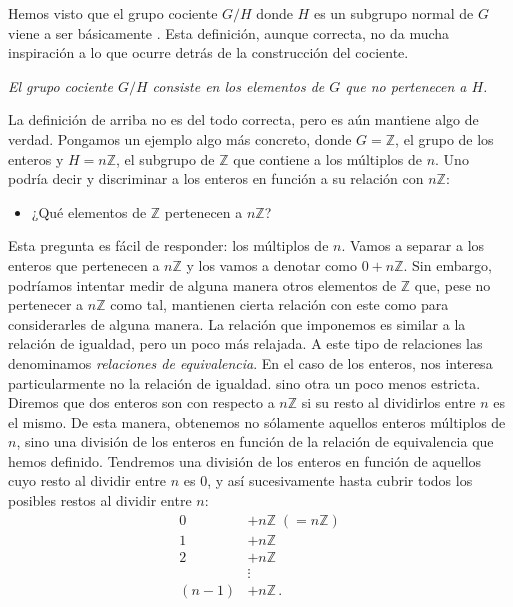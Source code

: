 \documentclass[a4paper,11pt]{amsart}
\theoremstyle{plain}
\theoremstyle{definition}
\theoremstyle{remark}
\begin{document}
Hemos visto que el grupo cociente $G/H$ donde $H$ es un subgrupo normal de $G$ viene a ser básicamente . Esta definición, aunque correcta, no da mucha inspiración a lo que ocurre detrás de la construcción del cociente. 

\begin{center}
    \textit{El grupo cociente $G/H$ consiste en los elementos de $G$ que no pertenecen a $H$.}
\end{center}
La definición de arriba no es del todo correcta, pero es aún mantiene algo de verdad. Pongamos un ejemplo algo más concreto, donde $G = \mathbb{Z}$, el grupo de los enteros y $H = n \mathbb{Z}$, el subgrupo de $\mathbb{Z}$ que contiene a los múltiplos de $n$. Uno podría decir y discriminar a los enteros en función a su relación con $n \mathbb{Z}$: 
\begin{itemize}
    \item ¿Qué elementos de $\mathbb{Z}$ pertenecen a $n \mathbb{Z}$?
\end{itemize}
Esta pregunta es fácil de responder: los múltiplos de $n$. Vamos a separar a los enteros que pertenecen a $n \mathbb{Z}$ y los vamos a denotar como $0 + n \mathbb{Z}$. Sin embargo, podríamos intentar medir de alguna manera otros elementos de $\mathbb{Z}$ que, pese no pertenecer a $n \mathbb{Z}$ como tal, mantienen cierta relación con este como para considerarles  de alguna manera. La relación que imponemos es similar a la relación de igualdad, pero un poco más relajada. A este tipo de relaciones las denominamos \textit{relaciones de equivalencia}. En el caso de los enteros, nos interesa particularmente no la relación de igualdad. sino otra un poco menos estricta. Diremos que dos enteros son  con respecto a $n\mathbb{Z}$ si su resto al dividirlos entre $n$ es el mismo. De esta manera, obtenemos no sólamente aquellos enteros múltiplos de $n$, sino una división de los enteros en función de la relación de equivalencia que hemos definido. Tendremos una división de los enteros en función de aquellos cuyo resto al dividir entre $n$ es $0$, y así sucesivamente hasta cubrir todos los posibles restos al dividir entre $n$:
\begin{align*}
     0 &+ n\mathbb{Z} \; (= n \mathbb{Z}) \\
     1 &+ n \mathbb{Z} \\
     2 &+ n \mathbb{Z} \\
     &\vdots \\
    (n-1) & + n \mathbb{Z} \, .
\end{align*}
\end{document}
